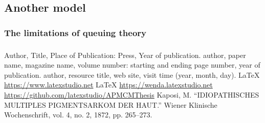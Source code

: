 \documentclass{apmcmthesis}
\begin{document}
\subsection{Another model}
\subsubsection{The limitations of queuing theory}




\subsubsection{}


\subsubsection{}



\subsubsection{}





\begin{thebibliography}{9}%
   Author, Title, Place of Publication: Press, Year of publication.
   author, paper name, magazine name, volume number: starting and ending
  page number, year of publication.
   author, resource title, web site, visit time (year, month, day).
   \LaTeX{} \url{https://www.latexstudio.net}
   \LaTeX{} \url{https://wenda.latexstudio.net}
    \url{https://github.com/latexstudio/APMCMThesis}
   Kaposi, M. “IDIOPATHISCHES MULTIPLES PIGMENTSARKOM DER HAUT.” Wiener Klinische Wochenschrift, vol. 4, no. 2, 1872, pp. 265–273.
\end{thebibliography}

\newpage
\end{document}

